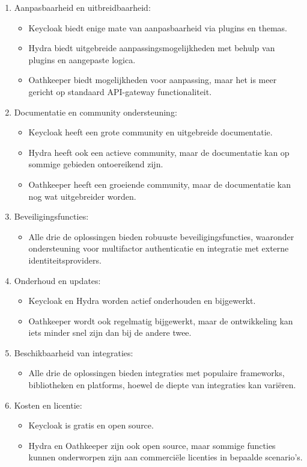 \begin{enumerate}
  \item Aanpasbaarheid en uitbreidbaarheid:
  \begin{itemize}
    \item Keycloak biedt enige mate van aanpasbaarheid via plugins en themas.
    \item Hydra biedt uitgebreide aanpassingsmogelijkheden met behulp van plugins en aangepaste logica.
    \item Oathkeeper biedt mogelijkheden voor aanpassing, maar het is meer gericht op standaard API-gateway functionaliteit.
  \end{itemize}
  
  \item Documentatie en community ondersteuning:
  \begin{itemize}
    \item Keycloak heeft een grote community en uitgebreide documentatie.
    \item Hydra heeft ook een actieve community, maar de documentatie kan op sommige gebieden ontoereikend zijn.
    \item Oathkeeper heeft een groeiende community, maar de documentatie kan nog wat uitgebreider worden.
  \end{itemize}
  
  \item Beveiligingsfuncties:
  \begin{itemize}
    \item Alle drie de oplossingen bieden robuuste beveiligingsfuncties, waaronder ondersteuning voor multifactor authenticatie en integratie met externe identiteitsproviders.
  \end{itemize}
  
  \item Onderhoud en updates:
  \begin{itemize}
    \item Keycloak en Hydra worden actief onderhouden en bijgewerkt.
    \item Oathkeeper wordt ook regelmatig bijgewerkt, maar de ontwikkeling kan iets minder snel zijn dan bij de andere twee.
  \end{itemize}
  
  \item Beschikbaarheid van integraties:
  \begin{itemize}
    \item Alle drie de oplossingen bieden integraties met populaire frameworks, bibliotheken en platforms, hoewel de diepte van integraties kan variëren.
  \end{itemize}
  
  \item Kosten en licentie:
  \begin{itemize}
    \item Keycloak is gratis en open source.
    \item Hydra en Oathkeeper zijn ook open source, maar sommige functies kunnen onderworpen zijn aan commerciële licenties in bepaalde scenario's.
  \end{itemize}
\end{enumerate}

